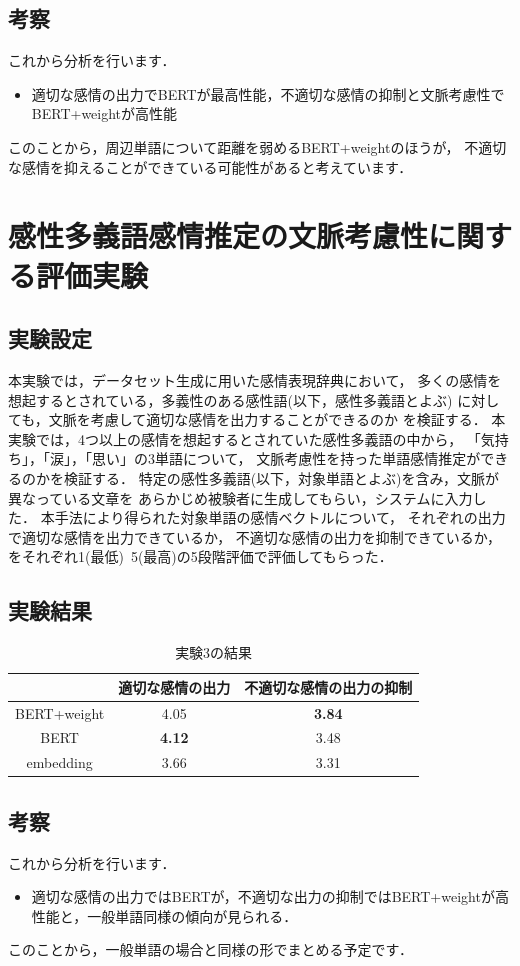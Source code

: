 	\subsection{考察}
	これから分析を行います．
	\begin{itemize}
		\item 適切な感情の出力でBERTが最高性能，不適切な感情の抑制と文脈考慮性でBERT+weightが高性能
	\end{itemize}
	このことから，周辺単語について距離を弱めるBERT+weightのほうが，
	不適切な感情を抑えることができている可能性があると考えています．

\section{感性多義語感情推定の文脈考慮性に関する評価実験}
	\subsection{実験設定}
	本実験では，データセット生成に用いた感情表現辞典において，
	多くの感情を想起するとされている，多義性のある感性語(以下，感性多義語とよぶ)
	に対しても，文脈を考慮して適切な感情を出力することができるのか
	を検証する．
	本実験では，4つ以上の感情を想起するとされていた感性多義語の中から，
	「気持ち」，「涙」，「思い」の3単語について，
	文脈考慮性を持った単語感情推定ができるのかを検証する．
	特定の感性多義語(以下，対象単語とよぶ)を含み，文脈が異なっている文章を
	あらかじめ被験者に生成してもらい，システムに入力した．
	本手法により得られた対象単語の感情ベクトルについて，
	それぞれの出力で適切な感情を出力できているか，
	不適切な感情の出力を抑制できているか，
	をそれぞれ1(最低)~5(最高)の5段階評価で評価してもらった．
	

	\subsection{実験結果}
	\begin{table}[H]
		\centering
		\caption{実験3の結果}
		\label{kansei_tagigo_result}
			\begin{tabular}{ccc}
				\hline
				& 適切な感情の出力 & 不適切な感情の出力の抑制 \\
				\hline \hline
				BERT+weight & 4.05 & \textbf{3.84} \\
				BERT & \textbf{4.12} & 3.48 \\
				embedding & 3.66 & 3.31 \\
				\hline
			\end{tabular}
	\end{table}

	\subsection{考察}
	これから分析を行います．
	\begin{itemize}
		\item 適切な感情の出力ではBERTが，不適切な出力の抑制ではBERT+weightが高性能と，一般単語同様の傾向が見られる．
	\end{itemize}
	このことから，一般単語の場合と同様の形でまとめる予定です．
